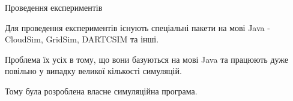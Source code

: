 \begin{frame}{Проведення експериментів}
	\manimate
	
	Для проведення експериментів існують спеціальні пакети на мові Java - CloudSim, GridSim, DARTCSIM та інші.
	
	Проблема їх усіх в тому, що вони базуються на мові Java та працюють дуже повільно у випадку великої кількості симуляцій.
	
	Тому була розроблена власне симуляційна програма.
\end{frame}




